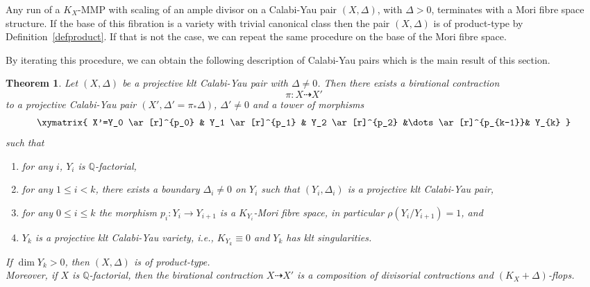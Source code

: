 \documentclass{amsart}[12pt,a4paper]
\newtheorem{theorem}{Theorem}[section]
\theoremstyle{definition}
\begin{document}
Any run of a $K_X$-MMP with scaling of an ample divisor on a Calabi-Yau pair $(X, \Delta)$, with $\Delta > 0$, terminates with a Mori fibre space structure.
If the base of this fibration is a variety with trivial canonical class then the pair $(X, \Delta)$ is of product-type  by Definition~\ref{defproduct}. 
If that is not the case, we can repeat the same procedure on the base of the Mori fibre space.

By iterating this procedure, we can obtain the following description of Calabi-Yau pairs which is 
the main result of this section.

\begin{theorem}
\label{structure}
Let $(X, \Delta)$ be a projective klt Calabi-Yau pair with $\Delta \neq 0$. 
Then there exists a birational contraction 
\[
		\pi \colon X \dashrightarrow X'
\]
to a projective Calabi-Yau pair $(X', \Delta' =\pi_\ast \Delta)$, $\Delta'\neq 0$ and a tower of morphisms
\begin{align}\label{mfs.tower.diag}
\xymatrix{
	X'=Y_0 \ar[r]^{p_0} & Y_1 \ar[r]^{p_1} & Y_2 \ar[r]^{p_2} &\dots \ar[r]^{p_{k-1}}& Y_{k}
}
\end{align}		
\noindent such that 
\begin{enumerate}
\item[(i)] 
for any $i$, $Y_i$ is $\mathbb{Q}$-factorial,
\item[(ii)] 
for any $1 \leq i < k$, there exists a boundary $\Delta_i \neq 0$ on $Y_i$ such that $(Y_i, \Delta_i)$ is a projective klt Calabi-Yau pair,
\item[(iii)] 
for any $0 \leq i \leq k$ the morphism $p_i\colon Y_i \to Y_{i+1}$ is a $K_{Y_i}$-Mori fibre space, in particular $\rho(Y_i/Y_{i+1})=1$, and
\item[(iv)]  
$Y_k$ is a projective klt Calabi-Yau variety, i.e., $K_{Y_k} \equiv 0$ and $Y_k$ has klt singularities.
\end{enumerate}		
\noindent	
If $\dim Y_k >0$, then $(X, \Delta)$ is of product-type.\\
Moreover, if $X$ is $\mathbb{Q}$-factorial, then the birational contraction $X \dashrightarrow X'$ is a composition of divisorial contractions and $(K_X+\Delta)$-flops.
\end{theorem}
\end{document}
